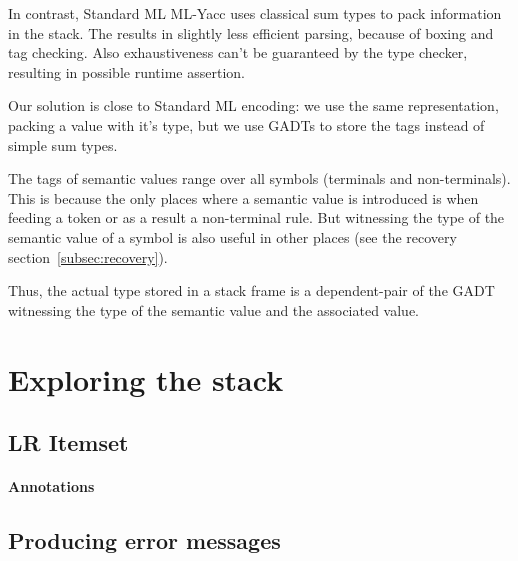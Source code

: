 \documentclass[twoside,a4paper]{article}
\begin{document}
In contrast, Standard ML ML-Yacc uses classical sum types to pack information
in the stack.  The results in slightly less efficient parsing, because of
boxing and tag checking.  Also exhaustiveness can't be guaranteed by the type
checker, resulting in possible runtime assertion.


Our solution is close to Standard ML encoding: we use the same representation,
packing a value with it's type, but we use GADTs to store the tags instead of
simple sum types.

The tags of semantic values range over all symbols (terminals and
non-terminals).  This is because the only places where a semantic value is
introduced is when feeding a token or as a result a non-terminal rule.  But
witnessing the type of the semantic value of a symbol is also useful in other
places (see the recovery section~\ref{subsec:recovery}).


Thus, the actual type stored in a stack frame is a dependent-pair of the GADT
witnessing the type of the semantic value and the associated value.


\section{Exploring the stack}

\subsection{LR Itemset}

\paragraph{Annotations}

\subsection{Producing error messages}
\end{document}
